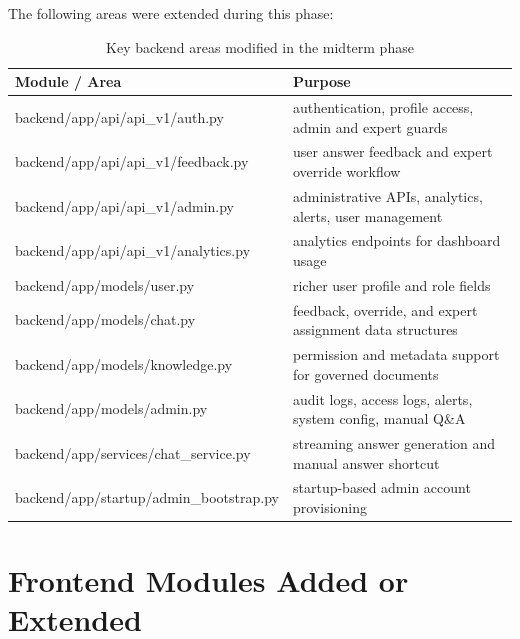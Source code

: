 \documentclass[12pt,a4paper]{report}
\begin{document}
The following areas were extended during this phase:
\begin{table}[H]
\centering
\begin{tabularx}{\textwidth}{>{\ttfamily}l X}
\toprule
Module / Area & Purpose \\
\midrule
backend/app/api/api\_v1/auth.py & authentication, profile access, admin and expert guards \\
backend/app/api/api\_v1/feedback.py & user answer feedback and expert override workflow \\
backend/app/api/api\_v1/admin.py & administrative APIs, analytics, alerts, user management \\
backend/app/api/api\_v1/analytics.py & analytics endpoints for dashboard usage \\
backend/app/models/user.py & richer user profile and role fields \\
backend/app/models/chat.py & feedback, override, and expert assignment data structures \\
backend/app/models/knowledge.py & permission and metadata support for governed documents \\
backend/app/models/admin.py & audit logs, access logs, alerts, system config, manual Q\&A \\
backend/app/services/chat\_service.py & streaming answer generation and manual answer shortcut \\
backend/app/startup/admin\_bootstrap.py & startup-based admin account provisioning \\
\bottomrule
\end{tabularx}
\caption{Key backend areas modified in the midterm phase}
\end{table}

\section{Frontend Modules Added or Extended}
\end{document}
